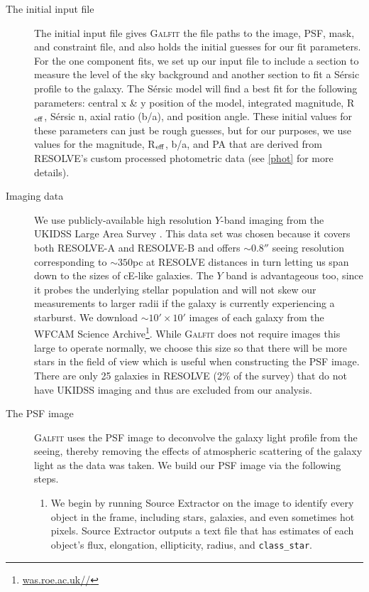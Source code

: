 \documentclass[iop,apj]{emulateapj}
\newcommand{\Reff}{R$_{\rm eff}$}
\begin{document}
\begin{description}

\item[The initial input file]{The initial input file gives \textsc{Galfit} the file paths to the image, PSF, mask, and constraint file, and also holds the initial guesses for our fit parameters. For the one component fits, we set up our input file to include a section to measure the level of the sky background and another section to fit a S\'ersic profile \citep{Sersic1963, Sersic1968} to the galaxy. The S\'ersic model will find a best fit for the following parameters: central x \& y position of the model, integrated magnitude, \Reff, S\'ersic n, axial ratio (b/a), and position angle. These initial values for these parameters can just be rough guesses, but for our purposes, we use values for the magnitude, \Reff, b/a, and PA that are derived from RESOLVE's custom processed photometric data (see \autoref{phot} for more details).}

\item[Imaging data]{We use publicly-available high resolution $Y$-band imaging from the UKIDSS Large Area Survey \citep{Lawrence2007}. This data set was chosen because it covers both RESOLVE-A and RESOLVE-B and offers $\sim0.8''$ seeing resolution corresponding to $\sim350$pc at RESOLVE distances in turn letting us span down to the sizes of cE-like galaxies. The $Y$ band is advantageous too, since it probes the underlying stellar population and will not skew our measurements to larger radii if the galaxy is currently experiencing a starburst. We download $\sim10'\times10'$ images of each galaxy from the WFCAM Science Archive\footnote{\url{was.roe.ac.uk//}}}. While \textsc{Galfit} does not require images this large to operate normally, we choose this size so that there will be more stars in the field of view which is useful when constructing the PSF image. There are only 25 galaxies in RESOLVE (2\% of the survey) that do not have UKIDSS imaging and thus are excluded from our analysis.

\item[The PSF image]{\textsc{Galfit} uses the PSF image to deconvolve the galaxy light profile from the seeing, thereby removing the effects of atmospheric scattering of the galaxy light as the data was taken. We build our PSF image via the following steps.
\begin{enumerate}

\item We begin by running Source Extractor on the image to identify every object in the frame, including stars, galaxies, and even sometimes hot pixels. Source Extractor outputs a text file that has estimates of each object's flux, elongation, ellipticity, radius, and \texttt{class\_star}.


\end{enumerate}}
\end{description}
\end{document}
